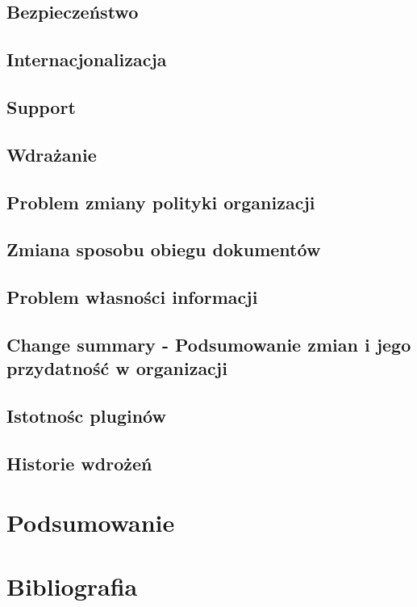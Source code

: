 \documentclass{article}
\begin{document}
	\subsection{Bezpieczeństwo}
	\subsection{Internacjonalizacja}
	\subsection{Support}

\subsection{Wdrażanie}
	\subsection{Problem zmiany polityki organizacji}
	\subsection{Zmiana sposobu obiegu dokumentów}
	
	\subsection{Problem własności informacji}


	\subsection{Change summary - Podsumowanie zmian i  jego przydatność w organizacji}
	\subsection{Istotnośc pluginów}
	\subsection{Historie wdrożeń} %


\section{Podsumowanie}

\section{Bibliografia}
	
\end{document}
